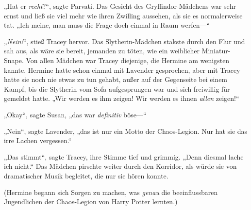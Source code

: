 „Hat er \emph{recht}?“, sagte Parvati. Das Gesicht des Gryffindor-Mädchens war sehr ernst und ließ sie viel mehr wie ihren Zwilling aussehen, als sie es normalerweise tat. „Ich meine, man muss die Frage doch einmal in Raum werfen—“

„\emph{Nein!}“, stieß Tracey hervor. Das Slytherin-Mädchen stakste durch den Flur und sah aus, als wäre sie bereit, jemanden zu töten, wie ein weiblicher Miniatur-Snape. Von allen Mädchen war Tracey diejenige, die Hermine am wenigsten kannte. Hermine hatte schon einmal mit Lavender gesprochen, aber mit Tracey hatte sie noch nie etwas zu tun gehabt, außer auf der Gegenseite bei einem Kampf, bis die Slytherin vom Sofa aufgesprungen war und sich freiwillig für \SPHEW gemeldet hatte. „Wir werden es ihm zeigen! Wir werden es ihnen \emph{allen} zeigen!“

„Okay“, sagte Susan, „das war \emph{definitiv} böse—“

„Nein“, sagte Lavender, „das ist nur ein Motto der Chaos-Legion. Nur hat sie das irre Lachen vergessen.“

„Das stimmt“, sagte Tracey, ihre Stimme tief und grimmig. „Denn diesmal lache ich nicht.“ Das Mädchen pirschte weiter durch den Korridor, als würde sie von dramatischer Musik begleitet, die nur sie hören konnte.

(Hermine begann sich Sorgen zu machen, was \emph{genau} die beeinflussbaren Jugendlichen der Chaos-Legion von Harry Potter lernten.)

